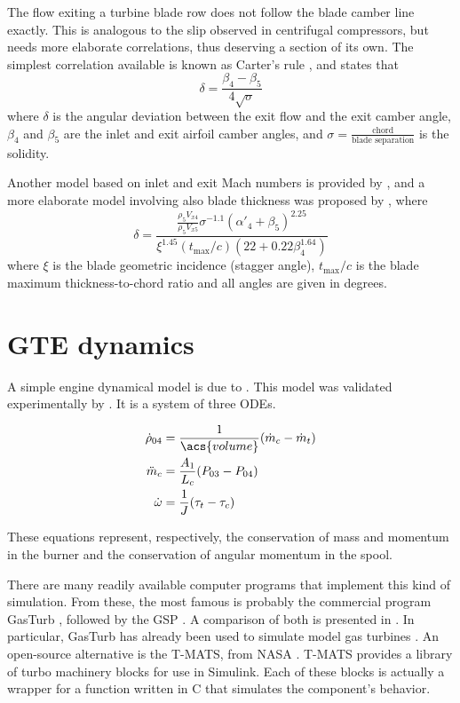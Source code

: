\documentclass[tcc]{subfiles}
\begin{document}
The flow exiting a turbine blade row does not follow the blade camber line exactly. 
This is analogous to the slip observed in centrifugal compressors, but needs more elaborate correlations, 
thus deserving a section of its own. 
The simplest correlation available is known as Carter's rule \cite{Mattingly1996}, and states that
\begin{equation}
    \label{eqn:cartersrule}
    \delta = \frac{\beta_4-\beta_5}{4\sqrt{\sigma}}
\end{equation}
where $\delta$ is the angular deviation between the exit flow and the exit camber angle,
$\beta_4$ and $\beta_5$ are the inlet and exit airfoil camber angles,
and $\sigma=\frac{\text{chord}}{\text{blade separation}}$ is the solidity.

Another model based on inlet and exit Mach numbers is provided by \textcite{Ainley1951}, 
and a more elaborate model involving also blade thickness was proposed by \textcite{Islam1999}, where
\begin{equation}
    \delta = \frac{\frac{\rho_5 V_{x4}}{\rho_5 V_{x5}} \sigma^{-1.1} (\alpha'_4+\beta_5)^{2.25}}
                        {\xi^{1.45} \left(t_{\max}/c\right) \left(22+0.22\beta_4^{1.64}\right)}
\end{equation}
where $\xi$ is the blade geometric incidence (stagger angle), 
$t_{\max}/c$ is the blade maximum thickness-to-chord ratio 
and all angles are given in degrees.

\section{\Acl{GTE} dynamics}

A simple engine dynamical model is due to \textcite{Fink1992}. 
This model was validated experimentally by \textcite{Gravdahl2004}.
It is a system of three \acp{ODE}.

\begin{align}
    \dot{\rho}_{04} &= \frac{1}{\acs{volume}}(\dot{m}_c - \dot{m}_t) \\
    \ddot{m}_c &= \frac{A_1}{L_c}(P_{03}-P_{04}) \\
    \dot{\omega} &= \frac{1}{J} (\tau_t-\tau_c)
\end{align}

These equations represent, respectively, 
the conservation of mass and momentum in the burner
and the conservation of angular momentum in the spool.

There are many readily available computer programs that implement this kind of simulation. 
From these, the most famous is probably the commercial program GasTurb \cite{GasTurb}, 
 
followed by the \gls{GSP} \cite{Visser2000}.
A comparison of both is presented in \textcite{GasTurbvsGSP}.
In particular, GasTurb has already been used to simulate model gas turbines 
\cite{gao2011modelling}.
An open-source alternative is the \gls{T-MATS}, from NASA \cite{T-MATS}.
\gls{T-MATS} provides a library of turbo machinery blocks for use in Simulink. 
Each of these blocks is actually a wrapper for a function written in C 
that simulates the component's behavior.
\end{document}
